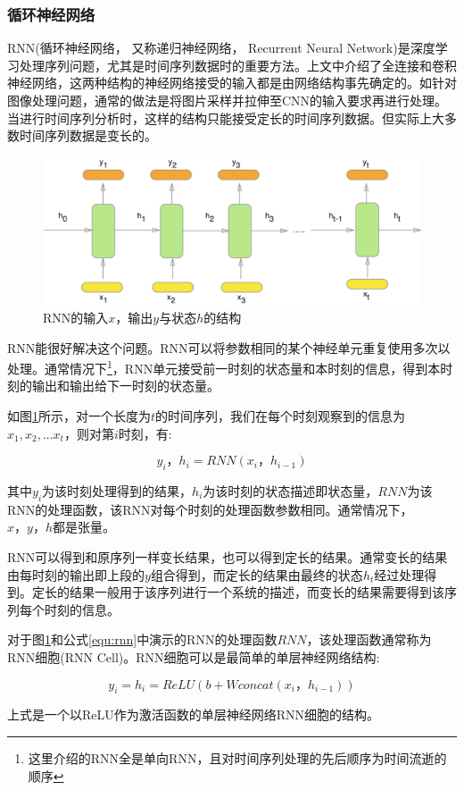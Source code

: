 \subsubsection{循环神经网络} \label{section:rnn}
RNN(循环神经网络， 又称递归神经网络， Recurrent Neural Network)是深度学习处理序列问题，尤其是时间序列数据时的重要方法。上文中介绍了全连接和卷积神经网络，这两种结构的神经网络接受的输入都是由网络结构事先确定的。如针对图像处理问题，通常的做法是将图片采样并拉伸至CNN的输入要求再进行处理。当进行时间序列分析时，这样的结构只能接受定长的时间序列数据。但实际上大多数时间序列数据是变长的。
\par
\begin{figure}[htbp!]
    \centering
    \includegraphics[width = 1.\textwidth]{chap/img/rnn.png}
    \caption{
        RNN的输入$x$，输出$y$与状态$h$的结构\supercite{how_rnn_work}
        }\label{fig:rnn}
\end{figure}
\par
RNN能很好解决这个问题。RNN可以将参数相同的某个神经单元重复使用多次以处理。通常情况下\footnote{这里介绍的RNN全是单向RNN，且对时间序列处理的先后顺序为时间流逝的顺序}，RNN单元接受前一时刻的状态量和本时刻的信息，得到本时刻的输出和输出给下一时刻的状态量。
\par
如图\ref{fig:rnn}所示，对一个长度为$t$的时间序列，我们在每个时刻观察到的信息为$x_1, x_2,... x_t$，则对第$i$时刻，有:
\par
\begin{equation} \label{equ:rnn} y_i，h_i = RNN(x_i， h_{i-1})  \end{equation}
\par
其中$y_i$为该时刻处理得到的结果，$h_i$为该时刻的状态描述即状态量，$RNN$为该RNN的处理函数，该RNN对每个时刻的处理函数参数相同。通常情况下，$x，y，h$都是张量。
\par
RNN可以得到和原序列一样变长结果，也可以得到定长的结果。通常变长的结果由每时刻的输出即上段的$y$组合得到，而定长的结果由最终的状态$h_t$经过处理得到。定长的结果一般用于该序列进行一个系统的描述，而变长的结果需要得到该序列每个时刻的信息。
\par
对于图\ref{fig:rnn}和公式\ref{equ:rnn}中演示的RNN的处理函数$RNN$，该处理函数通常称为RNN细胞(RNN Cell)。RNN细胞可以是最简单的单层神经网络结构:
\par
\begin{equation} \label{equ:simple_rnn} y_i = h_i = ReLU(b + W concat(x_i， h_{i-1}))  \end{equation}
\par
上式是一个以ReLU作为激活函数的单层神经网络RNN细胞的结构。
\par

